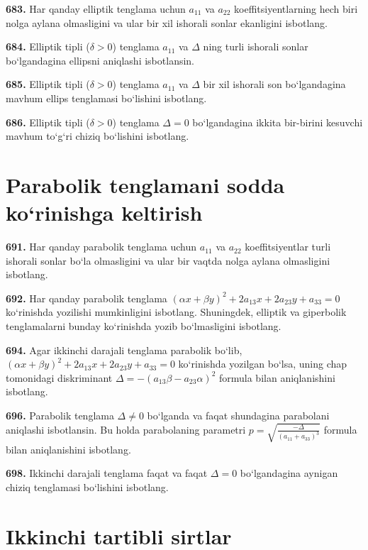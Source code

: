 \textbf{683.} Har qanday elliptik tenglama uchun $a_{11}$ va $a_{22}$ koeffitsiyentlarning hech biri nolga aylana olmasligini va ular bir xil ishorali sonlar ekanligini isbotlang.

\textbf{684.} Elliptik tipli ($\delta>0$) tenglama $a_{11}$ va $\Delta$ ning turli ishorali sonlar bo‘lgandagina ellipsni aniqlashi isbotlansin.

\textbf{685.} Elliptik tipli ($\delta>0$) tenglama $a_{11}$ va $\Delta$ bir xil ishorali son bo‘lgandagina mavhum ellips tenglamasi bo‘lishini isbotlang.

\textbf{686.} Elliptik tipli ($\delta>0$) tenglama $\Delta=0$ bo‘lgandagina ikkita bir-birini kesuvchi mavhum to‘g‘ri chiziq bo‘lishini isbotlang.


\section{Parabolik tenglamani sodda ko‘rinishga keltirish}



\textbf{691.} Har qanday parabolik tenglama uchun $a_{11}$ va $a_{22}$ koeffitsiyentlar turli ishorali sonlar bo‘la olmasligini va ular bir vaqtda nolga aylana olmasligini isbotlang.

\textbf{692.} Har qanday parabolik tenglama $ (\alpha x+\beta y) ^2+2a_{13}x+2a_{23}y+a_{33}=0$ ko‘rinishda yozilishi mumkinligini isbotlang. Shuningdek, elliptik va giperbolik tenglamalarni bunday ko‘rinishda yozib bo‘lmasligini isbotlang.

\textbf{694.} Agar ikkinchi darajali tenglama parabolik bo‘lib, $ (\alpha x+\beta y) ^2+2a_{13}x+2a_{23}y+a_{33}=0$ ko‘rinishda yozilgan bo‘lsa, uning chap tomonidagi diskriminant $\Delta=- (a_{13} \beta-a_{23} \alpha) ^2$ formula bilan aniqlanishini isbotlang.

\textbf{696.} Parabolik tenglama $\Delta \neq 0$ bo‘lganda va faqat shundagina parabolani aniqlashi isbotlansin. Bu holda parabolaning parametri $p=\sqrt{\frac{-\Delta}{ (a_{11}+a_{33}) ^3}}$ formula bilan aniqlanishini isbotlang.

\textbf{698.} Ikkinchi darajali tenglama faqat va faqat $\Delta=0$ bo‘lgandagina aynigan chiziq tenglamasi bo‘lishini isbotlang.



\section{Ikkinchi tartibli sirtlar}




